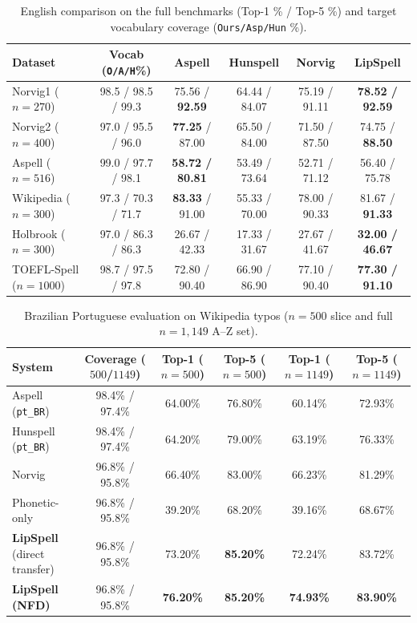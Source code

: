 \documentclass[11pt,a4paper]{article}
\begin{document}
\begin{table}[ht]
\centering
\small
\setlength{\tabcolsep}{4.5pt}
\caption{English comparison on the full benchmarks (Top-1 \% / Top-5 \%) and target vocabulary coverage (\texttt{Ours/Asp/Hun} \%).}
\label{tab:english_cmp}
\begin{tabular}{lccccc}
\toprule
Dataset & Vocab (\texttt{O/A/H}\%) & Aspell & Hunspell & Norvig & LipSpell \\
\midrule
Norvig1 ($n=270$)      & 98.5 / 98.5 / 99.3 & 75.56 / \textbf{92.59} & 64.44 / 84.07 & 75.19 / 91.11 & \textbf{78.52 / 92.59} \\
Norvig2 ($n=400$)      & 97.0 / 95.5 / 96.0 & \textbf{77.25} / 87.00 & 65.50 / 84.00 & 71.50 / 87.50 & 74.75 / \textbf{88.50} \\
Aspell ($n=516$)       & 99.0 / 97.7 / 98.1 & \textbf{58.72 / 80.81} & 53.49 / 73.64 & 52.71 / 71.12 & 56.40 / 75.78 \\
Wikipedia ($n=300$)    & 97.3 / 70.3 / 71.7 & \textbf{83.33} / 91.00 & 55.33 / 70.00 & 78.00 / 90.33 & 81.67 / \textbf{91.33} \\
Holbrook ($n=300$)     & 97.0 / 86.3 / 86.3 & 26.67 / 42.33 & 17.33 / 31.67 & 27.67 / 41.67 & \textbf{32.00 / 46.67} \\
TOEFL-Spell ($n=1000$) & 98.7 / 97.5 / 97.8 & 72.80 / 90.40 & 66.90 / 86.90 & 77.10 / 90.40 & \textbf{77.30 / 91.10} \\
\bottomrule
\end{tabular}
\end{table}

\begin{table}[ht]
\centering
\scriptsize
\setlength{\tabcolsep}{3pt}
\caption{Brazilian Portuguese evaluation on Wikipedia typos ($n=500$ slice and full $n=1{,}149$ A--Z set).}
\label{tab:ptbr}
\begin{tabular}{lccccc}
\toprule
System & Coverage ($500$/$1149$) & Top-1 ($n=500$) & Top-5 ($n=500$) & Top-1 ($n=1149$) & Top-5 ($n=1149$) \\
\midrule
Aspell (\texttt{pt\_BR})            & 98.4\% / 97.4\% & 64.00\% & 76.80\% & 60.14\% & 72.93\% \\
Hunspell (\texttt{pt\_BR})          & 98.4\% / 97.4\% & 64.20\% & 79.00\% & 63.19\% & 76.33\% \\
Norvig                              & 96.8\% / 95.8\% & 66.40\% & 83.00\% & 66.23\% & 81.29\% \\
Phonetic-only                       & 96.8\% / 95.8\% & 39.20\% & 68.20\% & 39.16\% & 68.67\% \\
\textbf{LipSpell} (direct transfer) & 96.8\% / 95.8\% & 73.20\% & \textbf{85.20\%} & 72.24\% & 83.72\% \\
\textbf{LipSpell (NFD)}             & 96.8\% / 95.8\% & \textbf{76.20\%} & \textbf{85.20\%} & \textbf{74.93\%} & \textbf{83.90\%} \\
\bottomrule
\end{tabular}
\end{table}
\end{document}
